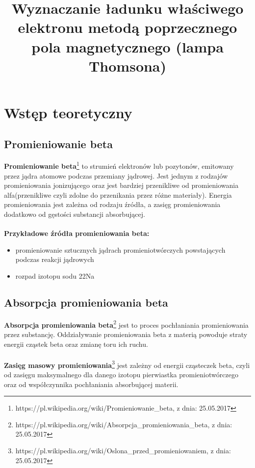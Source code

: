 \documentclass{article}
\begin{document}
\title{\huge\bfseries Wyznaczanie ładunku właściwego elektronu metodą
poprzecznego pola magnetycznego (lampa Thomsona)}
\date{}
\author{}
\maketitle
\section{Wstęp teoretyczny}
\subsection{Promieniowanie beta}
\textbf{Promieniowanie beta}\footnote[1]{https://pl.wikipedia.org/wiki/Promieniowanie\_beta, z dnia: 25.05.2017} to strumień elektronów lub pozytonów, emitowany przez jądra atomowe podczas przemiany jądrowej. Jest jednym z rodzajów promieniowania jonizującego oraz
jest bardziej przenikliwe od promieniowania alfa(przenikliwe czyli zdolne do przenikania przez różne materiały).
Energia promieniowania jest zależna od rodzaju źródła, a zasięg promieniowania dodatkowo od gęstości substancji absorbującej.\\\\
\textbf{Przykładowe źródła promieniowania beta:}
\begin{itemize}
\item promieniowanie sztucznych jądrach promieniotwórczych powstających podczas reakcji jądrowych
\item rozpad izotopu sodu 22Na
\end{itemize}
\subsection{Absorpcja promieniowania beta}
\textbf{Absorpcja promieniowania beta}\footnote[2]{https://pl.wikipedia.org/wiki/Absorpcja\_promieniowania\_beta, z dnia: 25.05.2017} jest to proces pochłaniania promieniowania przez substancję. Oddziaływanie promieniowania beta z materią powoduje straty energii cząstek beta oraz zmianę toru ich ruchu.\\\\
\textbf{Zasięg masowy promieniowania}\footnote[3]{https://pl.wikipedia.org/wiki/Oslona\_przed\_promieniowaniem, z dnia: 25.05.2017} jest zależny od energii cząsteczek beta, czyli od zasięgu maksymalnego dla danego izotopu pierwiastka promieniotwórczego oraz od współczynnika pochłaniania absorbującej materii.
\end{document}
